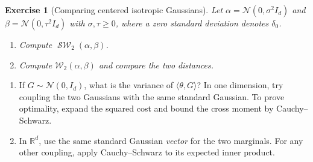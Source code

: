 \documentclass[11pt,a4paper]{article}
\theoremstyle{exostyle}
\newtheorem{exercise}{Exercise}
\newcommand{\R}{\mathbb{R}}
\newcommand{\Wtwo}{\mathcal{W}_2}
\newcommand{\ip}[2]{\langle #1,#2\rangle}
\DeclareMathOperator{\SW}{\mathcal{SW}}
\newcommand{\Gauss}{\mathcal N}
\begin{document}
\begin{exercise}[Comparing centered isotropic Gaussians]\label{ex-sliced-gaussians}
Let $\alpha=\Gauss(0,\sigma^2 I_d)$ and $\beta=\Gauss(0,\tau^2 I_d)$ with
$\sigma,\tau\geq0$, where a zero standard deviation denotes $\delta_0$.
\begin{enumerate}[label=(\alph*)]
\item Compute $\SW_2(\alpha,\beta)$.
\item Compute $\Wtwo(\alpha,\beta)$ and compare the two distances.
\end{enumerate}
\end{exercise}
\begin{hints}
\begin{enumerate}[label=(\alph*)]
\item If $G\sim\Gauss(0,I_d)$, what is the variance of $\ip{\theta}{G}$?
  In one dimension, try coupling the two Gaussians with the same standard
  Gaussian. To prove optimality, expand the squared cost and bound the
  cross moment by Cauchy--Schwarz.
\item In $\R^d$, use the same standard Gaussian \emph{vector} for the
  two marginals. For any other coupling, apply Cauchy--Schwarz to its
  expected inner product.
\end{enumerate}
\end{hints}
\end{document}
